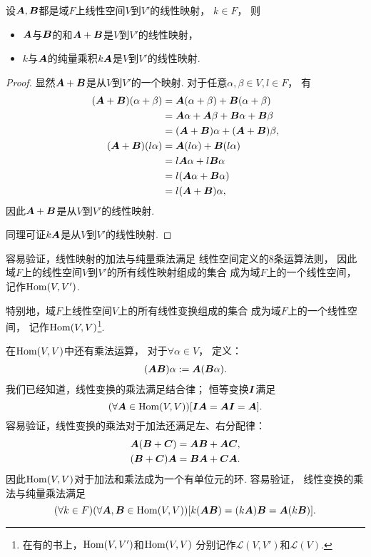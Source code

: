 \begin{proposition}
设\(\boldsymbol{A},\boldsymbol{B}\)都是域\(F\)上线性空间\(V\)到\(V'\)的线性映射，
\(k\in F\)，
则\begin{itemize}
	\item \(\boldsymbol{A}\)与\(\boldsymbol{B}\)的和\(\boldsymbol{A}+\boldsymbol{B}\)是\(V\)到\(V'\)的线性映射，
	\item \(k\)与\(\boldsymbol{A}\)的纯量乘积\(k\boldsymbol{A}\)是\(V\)到\(V'\)的线性映射.
\end{itemize}
\begin{proof}
显然\(\boldsymbol{A}+\boldsymbol{B}\)是从\(V\)到\(V'\)的一个映射.
对于任意\(\alpha,\beta \in V,
l \in F\)，
有\begin{align*}
	(\boldsymbol{A}+\boldsymbol{B})(\alpha+\beta)
	&= \boldsymbol{A}(\alpha+\beta) + \boldsymbol{B}(\alpha+\beta) \\
	&= \boldsymbol{A}\alpha + \boldsymbol{A}\beta + \boldsymbol{B}\alpha + \boldsymbol{B}\beta \\
	&= (\boldsymbol{A}+\boldsymbol{B})\alpha + (\boldsymbol{A}+\boldsymbol{B})\beta, \\
	(\boldsymbol{A}+\boldsymbol{B})(l\alpha)
	&= \boldsymbol{A}(l\alpha) + \boldsymbol{B}(l\alpha) \\
	&= l\boldsymbol{A}\alpha + l\boldsymbol{B}\alpha \\
	&= l(\boldsymbol{A}\alpha + \boldsymbol{B}\alpha) \\
	&= l(\boldsymbol{A}+\boldsymbol{B}) \alpha,
\end{align*}
因此\(\boldsymbol{A}+\boldsymbol{B}\)是从\(V\)到\(V'\)的线性映射.

同理可证\(k\boldsymbol{A}\)是从\(V\)到\(V'\)的线性映射.
\end{proof}
\end{proposition}

容易验证，线性映射的加法与纯量乘法满足
线性空间定义的8条运算法则，
因此域\(F\)上的线性空间\(V\)到\(V'\)的所有线性映射组成的集合
成为域\(F\)上的一个线性空间，
记作\(\operatorname{Hom}(V,V')\).

特别地，域\(F\)上线性空间\(V\)上的所有线性变换组成的集合
成为域\(F\)上的一个线性空间，
记作\(\operatorname{Hom}(V,V)\)\footnote{
	在有的书上，\(\operatorname{Hom}(V,V')\)和\(\operatorname{Hom}(V,V)\)
	分别记作\(\mathcal{L}(V,V')\)和\(\mathcal{L}(V)\).
}.

在\(\operatorname{Hom}(V,V)\)中还有乘法运算，
对于\(\forall\alpha \in V\)，
定义：\begin{gather*}
	(\boldsymbol{A}\boldsymbol{B})\alpha
	:=
	\boldsymbol{A}(\boldsymbol{B}\alpha).
\end{gather*}
我们已经知道，线性变换的乘法满足结合律；
恒等变换\(\boldsymbol{I}\)满足\[
	(\forall\boldsymbol{A}\in\operatorname{Hom}(V,V))
	[\boldsymbol{I}\boldsymbol{A}=\boldsymbol{A}\boldsymbol{I}=\boldsymbol{A}].
\]
容易验证，线性变换的乘法对于加法还满足左、右分配律：\begin{gather*}
	\boldsymbol{A}(\boldsymbol{B}+\boldsymbol{C})=\boldsymbol{A}\boldsymbol{B}+\boldsymbol{A}\boldsymbol{C}, \\
	(\boldsymbol{B}+\boldsymbol{C})\boldsymbol{A}=\boldsymbol{B}\boldsymbol{A}+\boldsymbol{C}\boldsymbol{A}.
\end{gather*}
因此\(\operatorname{Hom}(V,V)\)对于加法和乘法成为一个有单位元的环.
容易验证，
线性变换的乘法与纯量乘法满足\[
	(\forall k\in F)
	(\forall\boldsymbol{A},\boldsymbol{B}\in\operatorname{Hom}(V,V))
	[
		k(\boldsymbol{A}\boldsymbol{B})
		=(k\boldsymbol{A})\boldsymbol{B}
		=\boldsymbol{A}(k\boldsymbol{B})
	].
\]

